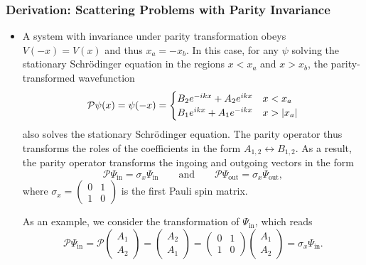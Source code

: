 \documentclass[11pt, a4paper]{article}
\newcommand{\Schro}{Schr\"{o}dinger\xspace}
\newcommand{\Par}{\mathcal{P}}  %
\begin{document}
\subsubsection{Derivation: Scattering Problems with Parity Invariance}
\begin{itemize}
    \item A system with invariance under parity transformation obeys $ V(-x) = V(x) $ and thus $ x_{a} = - x_{b} $. In this case, for any $ \psi $ solving the stationary \Schro equation in the regions $ x < x_{a} $ and $ x > x_{b} $, the parity-transformed wavefunction
    \begin{equation*}
        \Par \psi(x) = \psi(-x) = 
        \begin{cases}
            B_{2} e^{-ikx} + A_{2} e^{ikx} & x < x_{a}\\
            B_{1} e^{ikx} + A_{1} e^{-ikx} & x > \abs{x_{a}}
        \end{cases}
    \end{equation*}
    also solves the stationary \Schro equation. The parity operator thus transforms the roles of the coefficients in the form $ A_{1,2} \longleftrightarrow B_{1,2} $. As a result, the parity operator transforms the ingoing and outgoing vectors in the form
    \begin{equation*}
        \Par \Psi_{\text{in}} = \sigma_{x} \Psi_{\text{in}} \qquad \text{and} \qquad \Par \Psi_{\text{out}} = \sigma_{x}\Psi_{\text{out}},
    \end{equation*}
    where $ \sigma_{x} = \begin{pmatrix}
        0 & 1\\
        1 & 0
    \end{pmatrix} $ is the first Pauli spin matrix. 

    As an example, we consider the transformation of $ \Psi_{\text{in}} $, which reads
    \begin{equation*}
        \Par \Psi_{\text{in}} = \Par
        \begin{pmatrix}
            A_{1}\\
            A_{2}
        \end{pmatrix}
        = 
        \begin{pmatrix}
            A_{2}\\
            A_{1}
        \end{pmatrix}
        = 
        \begin{pmatrix}
            0 & 1\\
            1 & 0
        \end{pmatrix}
        \begin{pmatrix}
            A_{1}\\
            A_{2}
        \end{pmatrix}
        = \sigma_{x} \Psi_{\text{in}}.
    \end{equation*}
    

\end{itemize}
\end{document}
